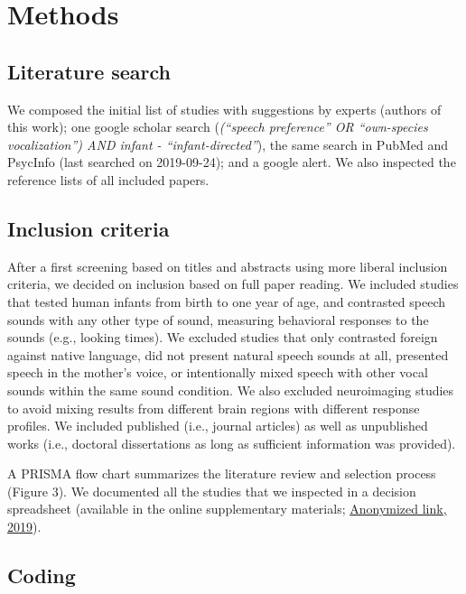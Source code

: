 \documentclass[man]{apa6}
\begin{document}
\section{Methods}\label{methods}

\subsection{Literature search}\label{literature-search}

We composed the initial list of studies with suggestions by experts
(authors of this work); one google scholar search
(\emph{(\enquote{speech preference} OR \enquote{own-species
vocalization}) AND infant - \enquote{infant-directed}}), the same search
in PubMed and PsycInfo (last searched on 2019-09-24); and a google
alert. We also inspected the reference lists of all included papers.

\subsection{Inclusion criteria}\label{inclusion-criteria}

After a first screening based on titles and abstracts using more liberal
inclusion criteria, we decided on inclusion based on full paper reading.
We included studies that tested human infants from birth to one year of
age, and contrasted speech sounds with any other type of sound,
measuring behavioral responses to the sounds (e.g., looking times). We
excluded studies that only contrasted foreign against native language,
did not present natural speech sounds at all, presented speech in the
mother's voice, or intentionally mixed speech with other vocal sounds
within the same sound condition. We also excluded neuroimaging studies
to avoid mixing results from different brain regions with different
response profiles. We included published (i.e., journal articles) as
well as unpublished works (i.e., doctoral dissertations as long as
sufficient information was provided).

A PRISMA flow chart summarizes the literature review and selection
process (Figure 3). We documented all the studies that we inspected in a
decision spreadsheet (available in the online supplementary materials;
\href{https://osf.io/4stz9/?view_only=d0696591ebf34bfc8430f848cd945ca8}{Anonymized
link, 2019}).

\subsection{Coding}\label{coding}
\end{document}
